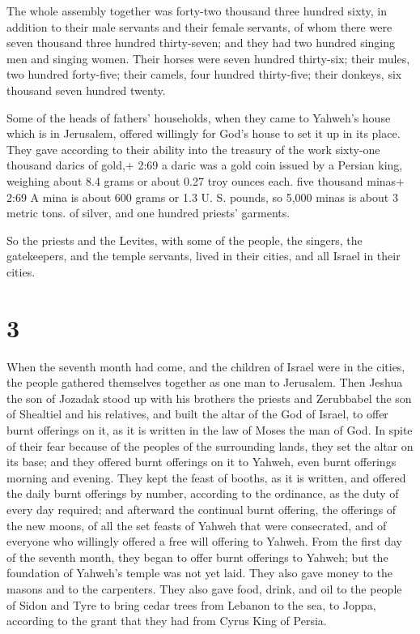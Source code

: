  The whole assembly together was forty-two thousand three
hundred sixty,  in addition to their male servants and
their female servants, of whom there were seven thousand three hundred
thirty-seven; and they had two hundred singing men and singing women.
 Their horses were seven hundred thirty-six; their mules,
two hundred forty-five;  their camels, four hundred
thirty-five; their donkeys, six thousand seven hundred twenty.

 Some of the heads of fathers' households, when they came
to Yahweh's house which is in Jerusalem, offered willingly for God's
house to set it up in its place.  They gave according to
their ability into the treasury of the work sixty-one thousand darics of
gold,+ 2:69 a daric was a gold coin issued by a Persian king, weighing
about 8.4 grams or about 0.27 troy ounces each. five thousand minas+
2:69 A mina is about 600 grams or 1.3 U. S. pounds, so 5,000 minas is
about 3 metric tons. of silver, and one hundred priests' garments.

 So the priests and the Levites, with some of the people,
the singers, the gatekeepers, and the temple servants, lived in their
cities, and all Israel in their cities.

\hypertarget{section-2}{%
\section{3}\label{section-2}}

 When the seventh month had come, and the children of Israel
were in the cities, the people gathered themselves together as one man
to Jerusalem.  Then Jeshua the son of Jozadak stood up with
his brothers the priests and Zerubbabel the son of Shealtiel and his
relatives, and built the altar of the God of Israel, to offer burnt
offerings on it, as it is written in the law of Moses the man of God.
 In spite of their fear because of the peoples of the
surrounding lands, they set the altar on its base; and they offered
burnt offerings on it to Yahweh, even burnt offerings morning and
evening.  They kept the feast of booths, as it is written,
and offered the daily burnt offerings by number, according to the
ordinance, as the duty of every day required;  and afterward
the continual burnt offering, the offerings of the new moons, of all the
set feasts of Yahweh that were consecrated, and of everyone who
willingly offered a free will offering to Yahweh.  From the
first day of the seventh month, they began to offer burnt offerings to
Yahweh; but the foundation of Yahweh's temple was not yet laid.
 They also gave money to the masons and to the carpenters.
They also gave food, drink, and oil to the people of Sidon and Tyre to
bring cedar trees from Lebanon to the sea, to Joppa, according to the
grant that they had from Cyrus King of Persia.

